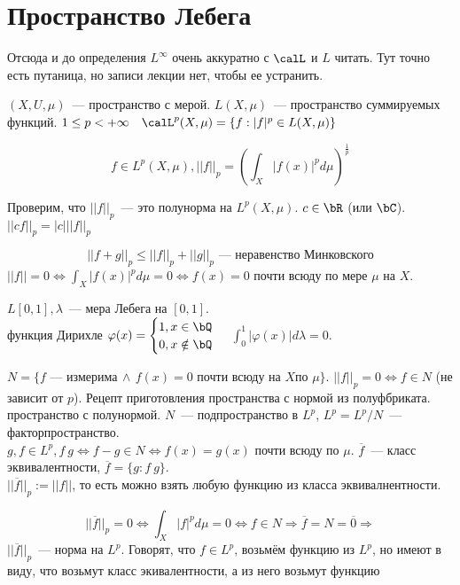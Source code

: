 \documentclass[document]{subfiles}
\begin{document}
\section{Пространство Лебега}
Отсюда и до определения $L^\infty$ очень аккуратно с $\calL$ и $L$ читать. Тут точно есть путаница, но записи лекции нет, чтобы ее устранить.
\begin{definition}
    $(X, U, \mu)$~--- пространство с мерой. $L(X, \mu)$~--- пространство суммируемых функций. $1 \leq p < +\infty \quad \calL^p(X, \mu) = \{ f: |f|^p \in L(X,\mu) \}$ 
\end{definition}

\[f \in L^p(X, \mu), ||f||_p = \left( \int_X |f(x)|^p d \mu \right)^{\frac{1}{p}} \]

Проверим, что $||f||_p$~--- это полунорма на $L^p(X,\mu)$. $c \in \bR$ (или $\bC$). $||cf||_p = |c| ||f||_p$

\[ ||f+g||_p \leq ||f||_p + ||g||_p \text{~--- неравенство Минковского} \]
$||f|| = 0 \Leftrightarrow \int_X |f(x)|^p d\mu = 0 \Leftrightarrow f(x) = 0$ почти всюду по мере $\mu$ на $X$.

\begin{example}
    $L[0,1], \lambda$~--- мера Лебега на $[0,1]$. \\
     функция Дирихле $\varphi(x) = \begin{cases}
        1, x \in \bQ \\
        0, x \notin \bQ
    \end{cases}$
    $\int^1_0 |\varphi(x)|d\lambda = 0$.
\end{example}

$N = \{ f \text{~--- измерима} \, \wedge \, f(x) = 0 \text{ почти всюду на } X \text {по } \mu \}.$
$||f||_p = 0 \Leftrightarrow f \in N$ (не зависит от $p$).
Рецепт приготовления пространства с нормой из полуфбриката. пространство с полунормой.
$N$~--- подпространство в $L^p$, $L^p = L^p / N$~--- факторпространство. \\

$g,f \in L^p, f ~ g \Leftrightarrow f - g \in N \Leftrightarrow f(x) = g(x)$ почти всюду по $\mu$. $\overline{f}$~--- класс эквивалентности, $\overline{f} = \{g: f ~ g \}.$ \\

$||\overline{f}||_p := ||f||$, то есть можно взять любую функцию из класса эквивалнентности.

\[ ||\overline{f}||_p = 0 \Leftrightarrow \int_X |f|^p d\mu = 0 \Leftrightarrow f \in N \Rightarrow \overline{f} = N = \overline{0} \Rightarrow \]
$||\overline{f}||_p $~--- норма на $L^p$.
Говорят, что $f \in L^p$, возьмём функцию из $L^p$, но имеют в виду, что возьмут класс экивалентности, а из него возьмут функцию
\end{document}
